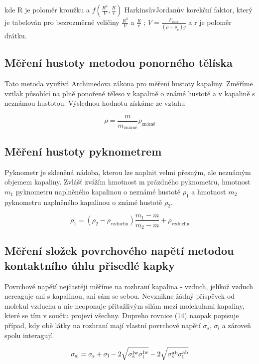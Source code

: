 \documentclass[a4paper,11pt]{article}
\begin{document}
\noindent
kde R je poloměr kroužku a $f (\frac{R^3}{V}, \frac{R}{r})$ HarkinsůvJordanův korekční faktor, který je tabelován pro bezrozměrné veličiny $\frac{R^3}{V}$ a $\frac{R}{r}$ ; $V=\frac{F_{\text{max}}}{(\rho - \rho_v)g}$ a r je poloměr drátku.

\subsection{Měření hustoty metodou ponorného tělíska}

Tato metoda využívá Archimedova zákona pro měření hustoty kapaliny. Změříme vztlak působící na plně ponořené těleso v kapalině o známé hustotě a v kapalině s neznámou hustotou. Výslednou hodnotu získáme ze vztahu

\begin{equation}
  \rho = \frac{m}{m_{\text{známé}}} \rho_{\text{známé}}
\end{equation}

\subsection{Měření hustoty pyknometrem}

Pyknometr je skleněná nádoba, kterou lze naplnit velmi přesným, ale neznámým objemem kapaliny. Zvlášť zvážím hmotnost m prázdného pyknometru, hmotnost $m_1$ pyknometru naplněného kapalinou o neznámé hustotě $\rho_1$ a hmotnost $m_2$ pyknometru naplněného kapalinou o známé hustotě $\rho_2$.

\begin{equation}
  \rho_1 = (\rho_2 - \rho_{\text{vzduchu}}) \frac{m_1 - m}{m_2 - m} + \rho_{\text{vzduchu}}
\end{equation}

\subsection{Měření složek povrchového napětí metodou kontaktního úhlu přisedlé kapky}

Povrchové napětí nejčastěji měříme na rozhraní kapalina - vzduch, jelikož vzduch nereaguje ani s kapalinou, ani sám se sebou. Nevznikne žádný příspěvek od molekul vzduchu a nic neoponuje přitažlivým silám mezi molekulami kapaliny, které se tím v součtu projeví všechny. Dupreho rovnice (14) naopak popisuje případ, kdy obě látky na rozhraní mají vlastní povrchové napětí $\sigma_s$,  $\sigma_l$ a zároveň spolu interagují.

\begin{equation}
  \sigma_{\text{sl}} =
  \sigma_{\text{s}} + \sigma_{\text{l}} - 2 \sqrt{\sigma_{\text{s}}^{\text{lw}}\sigma_{\text{l}}^{\text{lw}}} - 2\sqrt{\sigma_{\text{s}}^{\text{ab}}\sigma_{\text{l}}^{\text{ab}}} \\
\end{equation}
\end{document}
